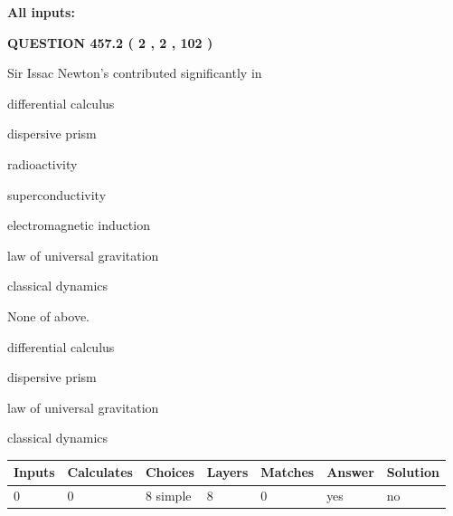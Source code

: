 \documentclass[12pt]{article}
\begin{document}
   
\noindent\vspace{0.1in}\hspace{-0.08in} {\textbf{\Large{All inputs: }}}
   
   
  
\vspace{0.2in}
  
{\textbf{\Large{QUESTION
457.2 
 ( 2 , 2 , 102 )
}}}
  
  
Sir Issac Newton's contributed significantly in
 
 
differential calculus
 
 
dispersive prism
 
 
radioactivity
 
 
superconductivity
 
 
electromagnetic induction
 
 
law of universal gravitation
 
 
classical dynamics
 
 
 None of above.
 
 
\noindent{}
 
 
differential calculus
 
 
dispersive prism
 
 
law of universal gravitation
 
 
classical dynamics
 
 
\noindent{}
 
 
   
   
   
   
\noindent\begin{tabular}{|l|l|l|l|l|l|l|}
 \hline
Inputs & Calculates & Choices & Layers & Matches & Answer & Solution \\ \hline
 0  & 
 0  & 
 8
  simple  
  & 
 8  & 
 0  & 
  yes & 
  no 
  \\ \hline
 \end{tabular}
   
   
   
   
\noindent{}
   
\end{document}
